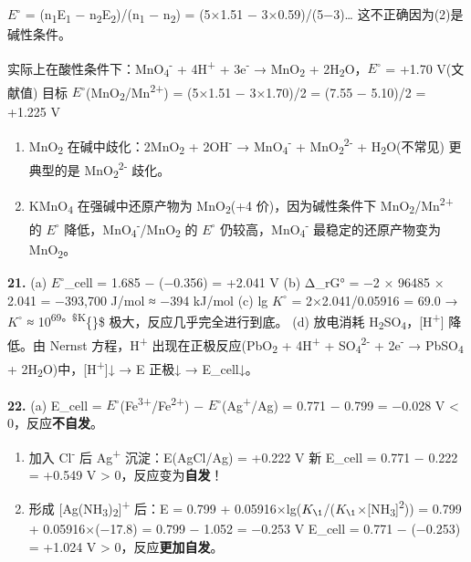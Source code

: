 \(E^{\circ}\) = (n\textsubscript{1}E\textsubscript{1} − n\textsubscript{2}E\textsubscript{2})/(n\textsubscript{1} − n\textsubscript{2}) = (5×1.51 − 3×0.59)/(5−3)\ldots{} 这不正确因为(2)是碱性条件。

实际上在酸性条件下：MnO\textsubscript{4}\textsuperscript{-} + 4H\textsuperscript{+} + 3e\textsuperscript{-} → MnO\textsubscript{2} + 2H\textsubscript{2}O，\(E^{\circ}\) = +1.70 V(文献值)
目标 \(E^{\circ}\)(MnO\textsubscript{2}/Mn\textsuperscript{2+}) = (5×1.51 − 3×1.70)/2 = (7.55 − 5.10)/2 = +1.225 V

\begin{enumerate}
\def\labelenumi{(\alph{enumi})}
\setcounter{enumi}{1}
\item
  MnO\textsubscript{2} 在碱中歧化：2MnO\textsubscript{2} + 2OH\textsuperscript{-} → MnO\textsubscript{4}\textsuperscript{-} + MnO\textsubscript{2}\textsuperscript{2-} + H\textsubscript{2}O(不常见)
  更典型的是 MnO\textsubscript{2}\textsuperscript{2-} 歧化。
\item
  KMnO\textsubscript{4} 在强碱中还原产物为 MnO\textsubscript{2}(+4 价)，因为碱性条件下 MnO\textsubscript{2}/Mn\textsuperscript{2+} 的 \(E^{\circ}\) 降低，MnO\textsubscript{4}\textsuperscript{-}/MnO\textsubscript{2} 的 \(E^{\circ}\) 仍较高，MnO\textsubscript{4}\textsuperscript{-} 最稳定的还原产物变为 MnO\textsubscript{2}。
\end{enumerate}

\textbf{21.}
(a) \(E^{\circ}\)\_cell = 1.685 − (−0.356) = +2.041 V
(b) Δ\_rG° = −2 × 96485 × 2.041 = −393,700 J/mol ≈ −394 kJ/mol
(c) lg \(K^{\circ}\) = 2×2.041/0.05916 = 69.0 → \(K^{\circ}\) ≈ 10\textsuperscript{69。\$K}\{\circ\}\$ 极大，反应几乎完全进行到底。
(d) 放电消耗 H\textsubscript{2}SO\textsubscript{4}，{[}H\textsuperscript{+}{]} 降低。由 Nernst 方程，H\textsuperscript{+} 出现在正极反应(PbO\textsubscript{2} + 4H\textsuperscript{+} + SO\textsubscript{4}\textsuperscript{2-} + 2e\textsuperscript{-} → PbSO\textsubscript{4} + 2H\textsubscript{2}O)中，{[}H\textsuperscript{+}{]}↓ → E 正极↓ → E\_cell↓。

\textbf{22.}
(a) E\_cell = \(E^{\circ}\)(Fe\textsuperscript{3+}/Fe\textsuperscript{2+}) − \(E^{\circ}\)(Ag\textsuperscript{+}/Ag) = 0.771 − 0.799 = −0.028 V \textless{} 0，反应\textbf{不自发}。

\begin{enumerate}
\def\labelenumi{(\alph{enumi})}
\setcounter{enumi}{1}
\item
  加入 Cl\textsuperscript{-} 后 Ag\textsuperscript{+} 沉淀：E(AgCl/Ag) = +0.222 V
  新 E\_cell = 0.771 − 0.222 = +0.549 V \textgreater{} 0，反应变为\textbf{自发}！
\item
  形成 {[}Ag(NH\textsubscript{3})\textsubscript{2}{]}\textsuperscript{+} 后：E = 0.799 + 0.05916×lg(\(K_{\1}\)/(\(K_{\1}\)×{[}NH\textsubscript{3}{]}\textsuperscript{2}))
  = 0.799 + 0.05916×(−17.8) = 0.799 − 1.052 = −0.253 V
  E\_cell = 0.771 − (−0.253) = +1.024 V \textgreater{} 0，反应\textbf{更加自发}。
\end{enumerate}

